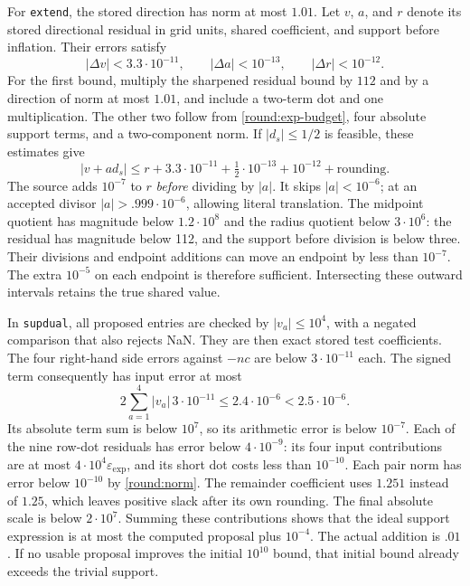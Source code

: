 For \texttt{extend}, the stored direction has norm at most $1.01$.
Let $v$, $a$, and $r$ denote its stored directional residual in grid
units, shared coefficient, and support before inflation.  Their errors
satisfy
\begin{equation}\label{round:clip-errors}
 |\Delta v|<3.3\cdot10^{-11},\qquad
 |\Delta a|<10^{-13},\qquad |\Delta r|<10^{-12}.
\end{equation}
For the first bound, multiply the sharpened residual bound by $112$
and by a direction of norm at most $1.01$, and include a two-term dot
and one multiplication.  The other two follow from
\eqref{round:exp-budget}, four absolute support terms, and a
two-component norm.  If $|d_s|\le1/2$ is feasible, these estimates give
\[
 |v+a d_s|\le r+3.3\cdot10^{-11}
                 +\tfrac12\cdot10^{-13}+10^{-12}+\text{rounding}.
\]
The source adds $10^{-7}$ to $r$ \emph{before} dividing by $|a|$.
It skips $|a|<10^{-6}$; at an accepted divisor
$|a|>.999\cdot10^{-6}$, allowing literal translation.
The midpoint quotient has magnitude below $1.2\cdot10^8$ and the
radius quotient below $3\cdot10^6$: the residual has magnitude below
112, and the support before division is below three.  Their divisions
and endpoint additions can move an endpoint by less than $10^{-7}$.
The extra $10^{-5}$ on each endpoint is therefore sufficient.
Intersecting these outward intervals retains the true shared value.

In \texttt{supdual}, all proposed entries are checked by
$|v_a|\le10^4$, with a negated comparison that also rejects NaN.
They are then exact stored test coefficients.  The four right-hand
side errors against $-nc$ are below $3\cdot10^{-11}$ each.  The signed
term consequently has input error at most
\[
 2\sum_{a=1}^4 |v_a|\,3\cdot10^{-11}
 \le2.4\cdot10^{-6}<2.5\cdot10^{-6}.
\]
Its absolute term sum is below $10^7$, so its arithmetic error is below
$10^{-7}$.  Each of the nine row-dot residuals has error below
$4\cdot10^{-9}$: its four input contributions are at most
$4\cdot10^4\varepsilon_{\exp}$, and its short dot costs less than
$10^{-10}$.  Each pair norm has error below $10^{-10}$ by
\eqref{round:norm}.  The remainder coefficient uses $1.251$ instead
of $1.25$, which leaves positive slack after its own rounding.
The final absolute scale is below $2\cdot10^7$.  Summing these
contributions shows that the ideal support expression is at most the
computed proposal plus $10^{-4}$.  The actual addition is $.01$.
If no usable proposal improves the initial $10^{10}$ bound, that
initial bound already exceeds the trivial support.

